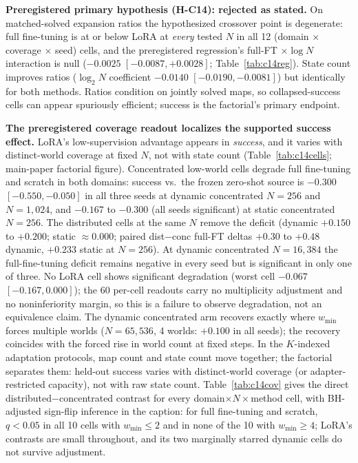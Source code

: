 \documentclass[letterpaper]{article} %
\begin{document}
\textbf{Preregistered primary hypothesis (H-C14): rejected as stated.} On matched-solved expansion ratios the hypothesized crossover point is degenerate: full fine-tuning is at or below LoRA at \emph{every} tested $N$ in all 12 (domain $\times$ coverage $\times$ seed) cells, and the preregistered regression's full-FT $\times \log N$ interaction is null ($-0.0025$ $[-0.0087, +0.0028]$; Table~\ref{tab:c14reg}). State count improves ratios ($\log_2 N$ coefficient $-0.0140$ $[-0.0190, -0.0081]$) but identically for both methods. Ratios condition on jointly solved maps, so collapsed-success cells can appear spuriously efficient; success is the factorial's primary endpoint.

\textbf{The preregistered coverage readout localizes the supported success effect.} LoRA's low-supervision advantage appears in \emph{success}, and it varies with distinct-world coverage at fixed $N$, not with state count (Table~\ref{tab:c14cells}; main-paper factorial figure). Concentrated low-world cells degrade full fine-tuning and scratch in both domains: success vs.\ the frozen zero-shot source is $-0.300$ $[-0.550,-0.050]$ in all three seeds at dynamic concentrated $N{=}256$ and $N{=}1{,}024$, and $-0.167$ to $-0.300$ (all seeds significant) at static concentrated $N{=}256$. The distributed cells at the same $N$ remove the deficit (dynamic $+0.150$ to $+0.200$; static $\approx 0.000$; paired dist$-$conc full-FT deltas $+0.30$ to $+0.48$ dynamic, $+0.233$ static at $N{=}256$). At dynamic concentrated $N{=}16{,}384$ the full-fine-tuning deficit remains negative in every seed but is significant in only one of three. No LoRA cell shows significant degradation (worst cell $-0.067$ $[-0.167, 0.000]$); the 60 per-cell readouts carry no multiplicity adjustment and no noninferiority margin, so this is a failure to observe degradation, not an equivalence claim. The dynamic concentrated arm recovers exactly where $w_{\min}$ forces multiple worlds ($N{=}65{,}536$, 4 worlds: $+0.100$ in all seeds); the recovery coincides with the forced rise in world count at fixed steps. In the $K$-indexed adaptation protocols, map count and state count move together; the factorial separates them: held-out success varies with distinct-world coverage (or adapter-restricted capacity), not with raw state count. Table~\ref{tab:c14cov} gives the direct distributed$-$concentrated contrast for every domain$\times N\times$method cell, with BH-adjusted sign-flip inference in the caption: for full fine-tuning and scratch, $q{<}0.05$ in all 10 cells with $w_{\min} \leq 2$ and in none of the 10 with $w_{\min} \geq 4$; LoRA's contrasts are small throughout, and its two marginally starred dynamic cells do not survive adjustment.
\end{document}
